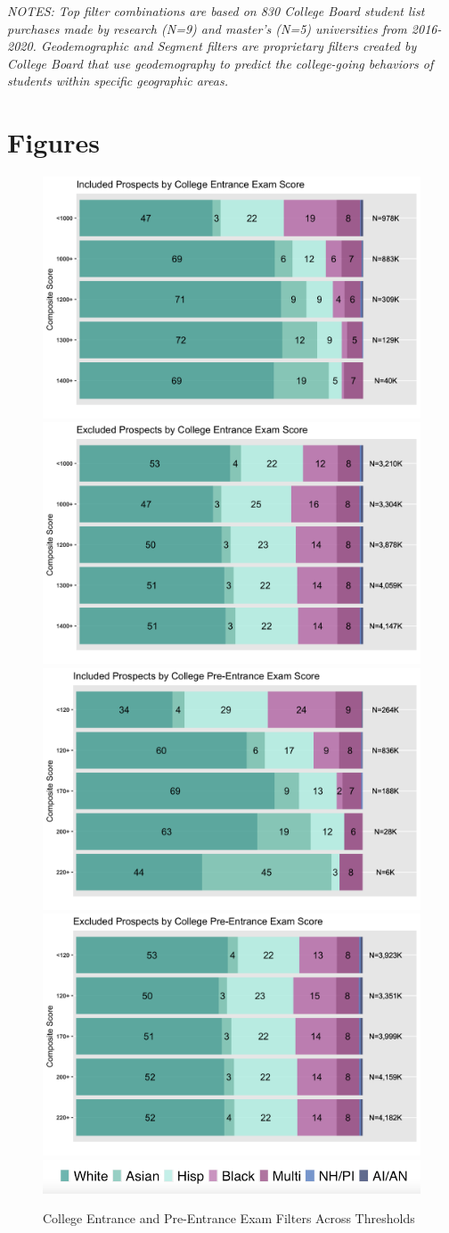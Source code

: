 \documentclass[
  12pt,
]{article}
\begin{document}
\emph{NOTES: Top filter combinations are based on 830 College Board student list purchases made by research (N=9) and master's (N=5) universities from 2016-2020. Geodemographic and Segment filters are proprietary filters created by College Board that use geodemography to predict the college-going behaviors of students within specific geographic areas.}

\clearpage

\newpage

\hypertarget{figures}{%
\section{Figures}\label{figures}}

\begin{figure}

{\centering \includegraphics[width=0.35\linewidth]{./../../outputs/figures/p2_sat_incv2} \includegraphics[width=0.35\linewidth]{./../../outputs/figures/p2_sat_excv2} \includegraphics[width=0.35\linewidth]{./../../outputs/figures/p2_psat_incv2} \includegraphics[width=0.35\linewidth]{./../../outputs/figures/p2_psat_excv2} \includegraphics[width=0.35\linewidth]{./../../outputs/figures/legend_horizontal} 

}

\caption{College Entrance and Pre-Entrance Exam Filters Across Thresholds}\label{fig:thresholds-tests}
\end{figure}
\end{document}
